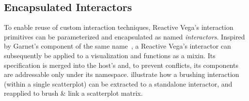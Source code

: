 \vspace{-10pt}

\subsection{Encapsulated Interactors}

\vspace{-10pt}

To enable reuse of custom interaction techniques, Reactive Vega's interaction
primitives can be parameterized and encapsulated as named \emph{interactors}.
Inspired by Garnet's component of the same name~\cite{myers:garnet}, a Reactive
Vega's interactor can subsequently be applied to a visualization and functions
as a mixin. Its specification is merged into the host's and, to prevent
conflicts, its components are addressable only under its namespace.
 illustrate how a brushing
interaction (within a single scatterplot) can be extracted to a standalone
interactor, and reapplied to brush \& link a scatterplot matrix.